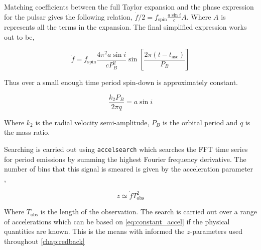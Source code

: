 Matching coefficients between the full Taylor expansion and the phase expression for the pulsar gives the following relation, $\dot f/2 = f_{\text{spin}} \frac{a \sin i}{c} A$. Where $A$ is represents all the terms in the expansion. The final simplified expression works out to be, 

\begin{equation}
    \dot f = f_\text{spin} \frac{4 \pi^2 a \sin i }{cP^2_B} \sin \left[ \frac{2 \pi (t - t_{\text{asc}})}{P_B} \right]
\end{equation}

Thus over a small enough time period spin-down is approximately constant.

\begin{equation}
    \frac{k_2 P_B}{2 \pi q} = a \sin i   
    \label{eq:constant_accel}
\end{equation}

Where $k_2$ is the radial velocity semi-amplitude, $P_B$ is the orbital period and $q$ is the mass ratio.

Searching is carried out using \texttt{accelsearch} which searches the FFT time series for period emissions by summing the highest Fourier frequency derivative. The number of bins that this signal is smeared is given by the acceleration parameter \citep{ransom_new_2001}, 

\begin{equation}
    z \simeq \dot f T^2_{\text{obs}}
\end{equation}

Where $T_{\text{obs}}$ is the length of the observation. The search is carried out over a range of accelerations which can be based on \cref{eq:constant_accel} if the physical quantities are known. This is the means with informed the $z$-parameters used throughout \cref{chap:redback}